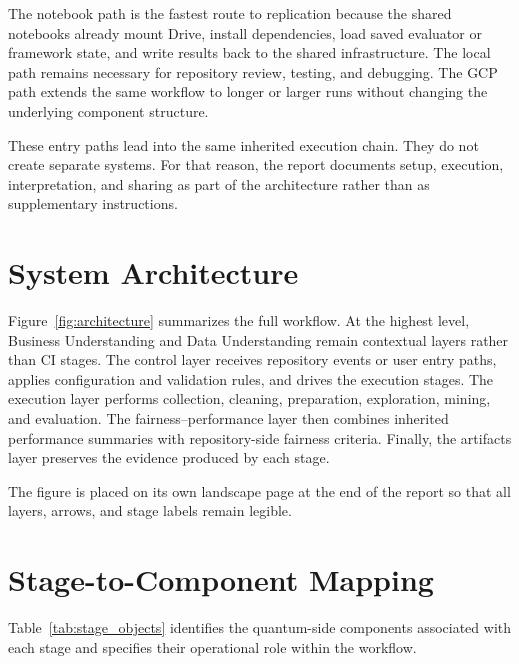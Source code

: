 \documentclass{IEEEtran}
\begin{document}
The notebook path is the fastest route to replication because the shared
notebooks already mount Drive, install dependencies, load saved evaluator or
framework state, and write results back to the shared infrastructure. The local
path remains necessary for repository review, testing, and debugging. The GCP
path extends the same workflow to longer or larger runs without changing the
underlying component structure.

These entry paths lead into the same inherited execution chain. They do not
create separate systems. For that reason, the report documents setup, execution,
interpretation, and sharing as part of the architecture rather than as
supplementary instructions.

\section{System Architecture}

Figure~\ref{fig:architecture} summarizes the full workflow. At the highest
level, Business Understanding and Data Understanding remain contextual layers
rather than CI stages. The control layer receives repository events or user
entry paths, applies configuration and validation rules, and drives the
execution stages. The execution layer performs collection, cleaning,
preparation, exploration, mining, and evaluation. The fairness--performance
layer then combines inherited performance summaries with repository-side
fairness criteria. Finally, the artifacts layer preserves the evidence produced
by each stage.

The figure is placed on its own landscape page at the end of the report so that
all layers, arrows, and stage labels remain legible.

\section{Stage-to-Component Mapping}

Table~\ref{tab:stage_objects} identifies the quantum-side components associated
with each stage and specifies their operational role within the workflow.
\end{document}
